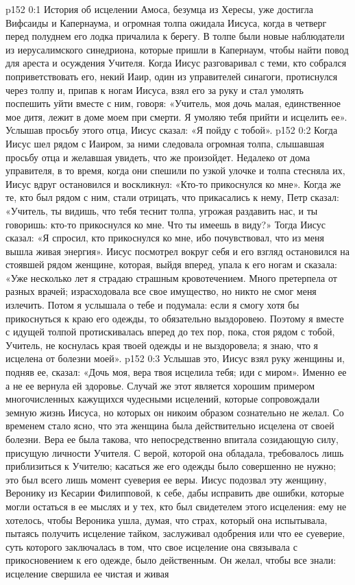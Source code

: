 \author{Комиссия срединников}
\vs p152 0:1 История об исцелении Амоса, безумца из Хересы, уже достигла Вифсаиды и Капернаума, и огромная толпа ожидала Иисуса, когда в четверг перед полуднем его лодка причалила к берегу. В толпе были новые наблюдатели из иерусалимского синедриона, которые пришли в Капернаум, чтобы найти повод для ареста и осуждения Учителя. Когда Иисус разговаривал с теми, кто собрался поприветствовать его, некий Иаир, один из управителей синагоги, протиснулся через толпу и, припав к ногам Иисуса, взял его за руку и стал умолять поспешить уйти вместе с ним, говоря: «Учитель, моя дочь малая, единственное мое дитя, лежит в доме моем при смерти. Я умоляю тебя прийти и исцелить ее». Услышав просьбу этого отца, Иисус сказал: «Я пойду с тобой».
\vs p152 0:2 Когда Иисус шел рядом с Иаиром, за ними следовала огромная толпа, слышавшая просьбу отца и желавшая увидеть, что же произойдет. Недалеко от дома управителя, в то время, когда они спешили по узкой улочке и толпа стесняла их, Иисус вдруг остановился и воскликнул: «Кто\hyp{}то прикоснулся ко мне». Когда же те, кто был рядом с ним, стали отрицать, что прикасались к нему, Петр сказал: «Учитель, ты видишь, что тебя теснит толпа, угрожая раздавить нас, и ты говоришь: кто\hyp{}то прикоснулся ко мне. Что ты имеешь в виду?» Тогда Иисус сказал: «Я спросил, кто прикоснулся ко мне, ибо почувствовал, что из меня вышла живая энергия». Иисус посмотрел вокруг себя и его взгляд остановился на стоявшей рядом женщине, которая, выйдя вперед, упала к его ногам и сказала: «Уже несколько лет я страдаю страшным кровотечением. Много претерпела от разных врачей; израсходовала все свое имущество, но никто не смог меня излечить. Потом я услышала о тебе и подумала: если я смогу хотя бы прикоснуться к краю его одежды, то обязательно выздоровею. Поэтому я вместе с идущей толпой протискивалась вперед до тех пор, пока, стоя рядом с тобой, Учитель, не коснулась края твоей одежды и не выздоровела; я знаю, что я исцелена от болезни моей».
\vs p152 0:3 Услышав это, Иисус взял руку женщины и, подняв ее, сказал: «Дочь моя, вера твоя исцелила тебя; иди с миром». Именно ее  а не ее  вернула ей здоровье. Случай же этот является хорошим примером многочисленных кажущихся чудесными исцелений, которые сопровождали земную жизнь Иисуса, но которых он никоим образом сознательно не желал. Со временем стало ясно, что эта женщина была действительно исцелена от своей болезни. Вера ее была такова, что непосредственно впитала созидающую силу, присущую личности Учителя. С верой, которой она обладала, требовалось лишь приблизиться к Учителю; касаться же его одежды было совершенно не нужно; это был всего лишь момент суеверия ее веры. Иисус подозвал эту женщину, Веронику из Кесарии Филипповой, к себе, дабы исправить две ошибки, которые могли остаться в ее мыслях и у тех, кто был свидетелем этого исцеления: ему не хотелось, чтобы Вероника ушла, думая, что страх, который она испытывала, пытаясь получить исцеление тайком, заслуживал одобрения или что ее суеверие, суть которого заключалась в том, что свое исцеление она связывала с прикосновением к его одежде, было действенным. Он желал, чтобы все знали: исцеление свершила ее чистая и живая 
